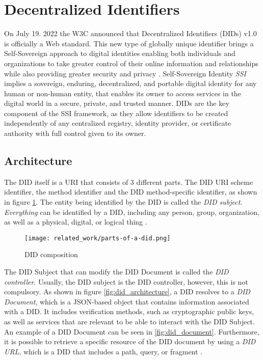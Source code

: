 \section{Decentralized Identifiers} \label{section:dids}

On July 19. 2022 the W3C announced that Decentralized Identifiers (DIDs) v1.0 is officially a Web standard. This new type of globally unique identifier brings a Self-Sovereign approach to digital identities enabling both individuals and organizations to take greater control of their online information and relationships while also providing greater security and privacy \cite{w3c_2022}. Self-Sovereign Identity \emph{SSI} implies a sovereign, enduring, decentralized, and portable digital identity for any human or non-human entity, that enables its owner to access services in the digital world in a secure, private, and trusted manner. DIDs are the key component of the SSI framework, as they allow identifiers to be created independently of any centralized registry, identity provider, or certificate authority with full control given to its owner\cite{Naik_Jenkins_2021}\cite{sporny_longley_sabadello_reed_steele_2021}.

\subsection{Architecture}

The DID itself is a URI that consists of 3 different parts. The DID URI scheme identifier, the method identifier and the DID method-specific identifier, as shown in figure \ref{fig:did}. The entity being identified by the DID is called the \emph{DID subject}. \emph{Everything} can be identified by a DID, including any person, group, organization, as well as a physical, digital, or logical thing \cite{Conway_Hughes_Ma_Poole_Riedel_2019}\cite{sporny_longley_sabadello_reed_steele_2021}.

\begin{figure}[h]
  \centering
  \texttt{[image: related\_work/parts-of-a-did.png]}
  \caption{DID composition \cite{sporny_longley_sabadello_reed_steele_2021}}
  \label{fig:did}
\end{figure}


The DID Subject that can modify the DID Document is called the \emph{DID controller}. Usually, the DID subject is the DID controller, however, this is not compulsory. As shown in figure \ref{fig:did_architecture}, a DID resolves to a \emph{DID Document}, which is a JSON-based object that contains information associated with a DID. It includes verification methods, such as cryptographic public keys, as well as services that are relevant to be able to interact with the DID Subject. An example of a DID Document can be seen in \ref{fig:did_document}. Furthermore, it is possible to retrieve a specific resource of the DID document by using a \emph{DID URL}, which is a DID that includes a path, query, or fragment \cite{sporny_longley_sabadello_reed_steele_2021}.

